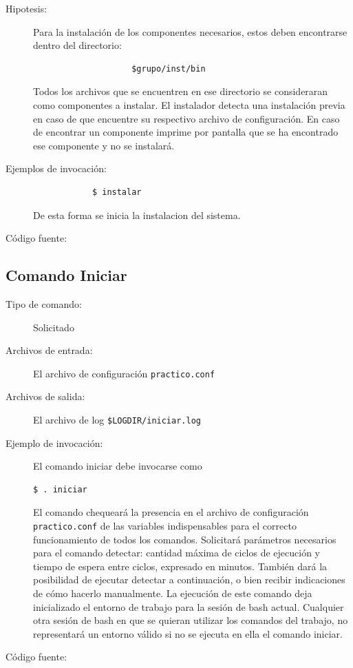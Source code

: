 \documentclass[12pt]{article}
\begin{document}
\begin{description}
	\item [Hipotesis:] 
			Para la instalación de los componentes necesarios, estos deben encontrarse dentro del directorio:
				\begin{verbatim}
					$grupo/inst/bin
				\end{verbatim}
			Todos los archivos que se encuentren en ese directorio se consideraran como componentes a instalar. 
			El instalador detecta una instalación previa en caso de que encuentre su respectivo archivo de configuración. 
			En caso de encontrar un componente imprime por pantalla que se ha encontrado ese componente y no se instalará.
	
	
	\item [Ejemplos de invocación:]
		\begin{verbatim}
			$ instalar
		\end{verbatim}
		
		De esta forma se inicia la instalacion del sistema.
	
	\item [Código fuente:]
\end{description}


\subsection{Comando Iniciar}
\begin{description}
	\item [Tipo de comando:] Solicitado
	
	\item [Archivos de entrada:] El archivo de configuración \verb|practico.conf|
	
	\item [Archivos de salida:] El archivo de log \verb|$LOGDIR/iniciar.log|
	
	\item [Ejemplo de invocación:] El comando iniciar debe invocarse como
	\begin{verbatim}$ . iniciar\end{verbatim}
	El comando chequeará la presencia en el archivo de configuración \verb|practico.conf| de las variables indispensables para el correcto funcionamiento de todos los comandos. Solicitará parámetros necesarios para el comando detectar: cantidad máxima de ciclos de ejecución y tiempo de espera entre ciclos, expresado en minutos. También dará la posibilidad de ejecutar detectar a continuación, o bien recibir indicaciones de cómo hacerlo manualmente. La ejecución de este comando deja inicializado el entorno de trabajo para la sesión de bash actual. Cualquier otra sesión de bash en que se quieran utilizar los comandos del trabajo, no representará un entorno válido si no se ejecuta en ella el comando iniciar.
	
	\item [Código fuente:]
\end{description}
{\footnotesize

}
\end{document}

